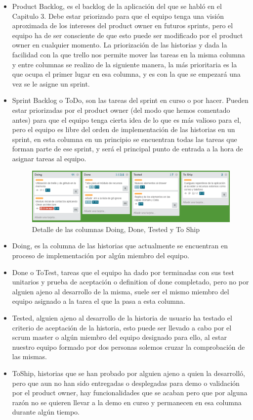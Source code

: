 \documentclass[../pfc.tex]{subfiles}
\begin{document}
	\begin{itemize} 
		\item Product Backlog, es el backlog de la aplicación del que se habló en el Capitulo 3. Debe estar priorizado para que el equipo tenga una visión aproximada de los intereses del product owner en futuros sprints, pero el equipo ha de ser consciente de que esto puede ser modificado por el product owner en cualquier momento. La priorización de las historias y dada la facilidad con la que trello nos permite mover las tareas en la misma columna y entre columnas se realizo de la siguiente manera, la más prioritaria es la que ocupa el primer lugar en esa columna, y es con la que se empezará una vez se le asigne un sprint.
		\item Sprint Backlog o ToDo, son las tareas del sprint en curso o por hacer. Pueden estar priorizadas por el product owner (del modo que hemos comentado antes) para que el equipo tenga cierta idea de lo que es más valioso para el, pero el equipo es libre del orden de implementación de las historias en un sprint, en esta columna en un principio se encuentran todas las tareas que forman parte de ese sprint, y será el principal punto de entrada a la hora de asignar tareas al equipo. 
		
		\begin{figure}[H]
			\centering
			\includegraphics[width=1\linewidth]{../images/do_done}
			\caption{Detalle de las columnas Doing, Done, Tested y To Ship}
			\label{fig:trelloDDTT}
		\end{figure}
		
		\item Doing, es la columna de las historias que actualmente se encuentran en proceso de implementación por algún miembro del equipo.
		\item Done o ToTest, tareas que el equipo ha dado por terminadas con sus test unitarios y prueba de aceptación o definition of done completado, pero no por alguien ajeno al desarrollo de la misma, suele ser el mismo miembro del equipo asignado a la tarea el que la pasa a esta columna. 
		\item Tested, alguien ajeno al desarrollo de la historia de usuario ha testado el criterio de aceptación de la historia, esto puede ser llevado a cabo por el scrum master o algún miembro del equipo designado para ello, al estar nuestro equipo formado por dos personas solemos cruzar la comprobación de las mismas. 
		\item ToShip, historias que se han probado por alguien ajeno a quien la desarrolló, pero que aun no han sido entregadas o desplegadas para demo o validación por el product owner, hay funcionalidades que se acaban pero que por alguna razón no se quieren llevar a la demo en curso y permanecen en esa columna durante algún tiempo.
		

\end{itemize}
\end{document}
